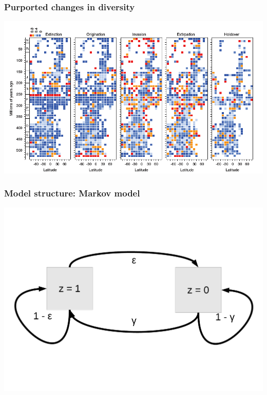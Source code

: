 \documentclass{beamer}
\begin{document}
\begin{frame}
  \frametitle{Purported changes in diversity}
  \begin{center}
    \includegraphics[width=\textwidth,height=0.8\textheight,keepaspectratio=true]{figure/powell_2015}
  \end{center}

\end{frame}


\begin{frame}
  \frametitle{Model structure: Markov model}
  \begin{center}
    \includegraphics[width=\textwidth,height=0.8\textheight,keepaspectratio=true]{figure/mm_diagram}
  \end{center}
\end{frame}
\end{document}
